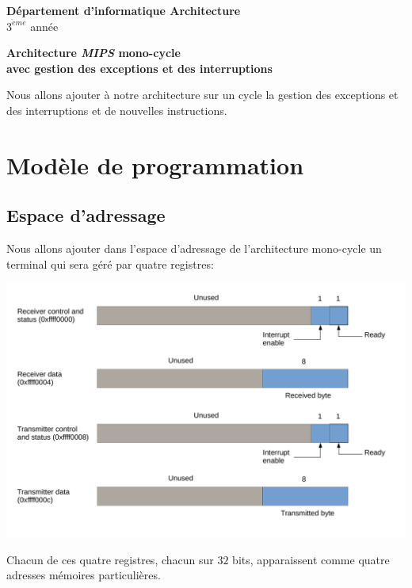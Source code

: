 \documentclass[12pt]{article}
\begin{document}
\noindent
{\bf Département d'informatique \hfill Architecture} \\
$3^{\grave{e}me}$ année
\vspace*{1cm}
\begin{center}
  {\large \bf Architecture \emph{MIPS} mono-cycle\\
    avec gestion des exceptions et des interruptions}
\end{center}

\renewcommand{\labelitemi}{$\bullet$}
\renewcommand{\labelitemii}{$\star$}

Nous allons ajouter à notre architecture sur un cycle la gestion des exceptions et des interruptions
et de nouvelles instructions.

\section{Modèle de programmation}

\subsection{Espace d'adressage}

Nous allons ajouter dans l'espace d'adressage de l'architecture mono-cycle un terminal qui sera géré par quatre
registres:

\begin{center}
  \includegraphics[width=18cm]{terminal.pdf}
\end{center}

Chacun de ces quatre registres, chacun sur $32$ bits, apparaissent comme quatre adresses mémoires particulières.\\
\end{document}
